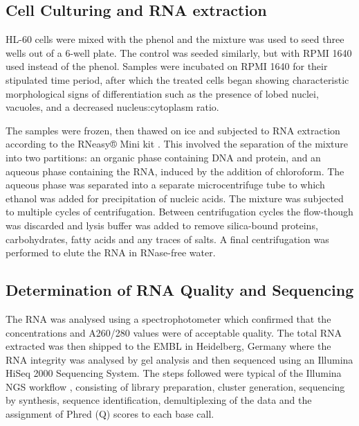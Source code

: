 \subsection{Cell Culturing and RNA extraction}%
HL-60 cells were mixed with the phenol and the mixture was used to seed three wells out of a 6-well plate. The control was seeded similarly, but with RPMI 1640 used instead of the phenol. Samples were incubated on RPMI 1640 for their stipulated time period, after which the treated cells began showing characteristic morphological signs of differentiation such as the presence of lobed nuclei, vacuoles, and a decreased nucleus:cytoplasm ratio.

The samples were frozen, then thawed on ice and subjected to RNA extraction according to the RNeasy® Mini kit \citep{RNeasy}. This involved the separation of the mixture into two partitions: an organic phase containing DNA and protein, and an aqueous phase containing the RNA, induced by the addition of chloroform. The aqueous phase was separated into a separate microcentrifuge tube to which ethanol was added for precipitation of nucleic acids. The mixture was subjected to multiple cycles of centrifugation. Between centrifugation cycles the flow-though was discarded and lysis buffer was added to remove silica-bound proteins, carbohydrates, fatty acids and any traces of salts. A final centrifugation was performed to elute the RNA in RNase-free water.

\subsection{Determination of RNA Quality and Sequencing}%
The RNA was analysed using a spectrophotometer which confirmed that the concentrations and A260/280 values were of acceptable quality. The total RNA extracted was then shipped to the \ac{EMBL} in Heidelberg, Germany where the RNA integrity was analysed by gel analysis and then sequenced using an Illumina HiSeq 2000 Sequencing System. The steps followed were typical of the Illumina \ac{NGS} workflow \citep{HiSeq2000}, consisting of library preparation, cluster generation, sequencing by synthesis, sequence identification, demultiplexing of the data and the assignment of Phred (Q) scores to each base call.

